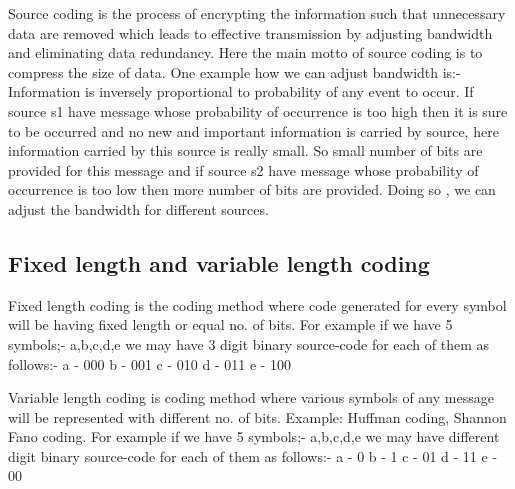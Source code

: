 \documentclass[10pt,a4paper]{article}
\begin{document}
	 Source coding is the process of encrypting the information such that unnecessary data are removed which leads to effective transmission by 
	 adjusting bandwidth and 
	 eliminating data redundancy.
	 Here the main motto of source coding is to compress the size of data.
	 \newline
	 One example how we can adjust bandwidth is:- 
	 \newline
	 Information is inversely proportional to probability of any event to occur. If source s1 have message whose probability of occurrence is too high then it is sure to be occurred and no new and important information is carried by source, here information carried by this source is really small. So  small number of bits are provided for this message and if source s2 have message whose probability of occurrence is too low then more number of bits are provided. Doing so , we can adjust the bandwidth for different sources.
	 
	 \subsection{Fixed length and variable length coding}
	 
	 Fixed length coding is the coding method where code generated for every symbol will be having fixed length or equal no. of bits. For example
	 if we have 5 symbols;- a,b,c,d,e we may have 3 digit binary source-code for each of them  as follows:-
	 \newline
	 a - 000\newline
	 b - 001\newline
	 c - 010\newline
	 d - 011\newline
	 e - 100
     
     Variable length coding is coding method where various symbols of any message will be represented with different no. of bits.  Example: Huffman coding, Shannon Fano coding. For example if we have 5 symbols;- a,b,c,d,e we may have different digit binary source-code for each of them  as follows:-
     \newline
     a - 0\newline
     b - 1\newline
     c - 01\newline
     d - 11\newline
     e - 00\newline
     
\end{document}
